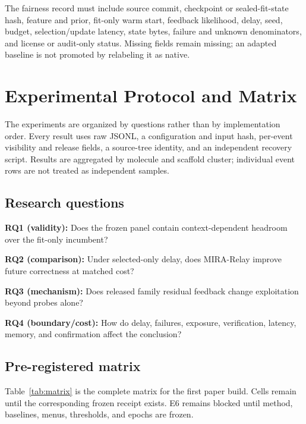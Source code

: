 \documentclass[sigconf,anonymous]{aamas}
\newcommand{\tbd}{\text{TBD}}
\begin{document}
The fairness record must include source commit, checkpoint or sealed-fit-state hash, feature and prior, fit-only warm start, feedback likelihood, delay, seed, budget, selection/update latency, state bytes, failure and unknown denominators, and license or audit-only status. Missing fields remain missing; an adapted baseline is not promoted by relabeling it as native.

\section{Experimental Protocol and Matrix}
The experiments are organized by questions rather than by implementation order. Every result uses raw JSONL, a configuration and input hash, per-event visibility and release fields, a source-tree identity, and an independent recovery script. Results are aggregated by molecule and scaffold cluster; individual event rows are not treated as independent samples.

\subsection{Research questions}
\textbf{RQ1 (validity):} Does the frozen panel contain context-dependent headroom over the fit-only incumbent?\par
\textbf{RQ2 (comparison):} Under selected-only delay, does MIRA-Relay improve future correctness at matched cost?\par
\textbf{RQ3 (mechanism):} Does released family residual feedback change exploitation beyond probes alone?\par
\textbf{RQ4 (boundary/cost):} How do delay, failures, exposure, verification, latency, memory, and confirmation affect the conclusion?

\subsection{Pre-registered matrix}
Table~\ref{tab:matrix} is the complete matrix for the first paper build. Cells remain \tbd{} until the corresponding frozen receipt exists. E6 remains blocked until method, baselines, menus, thresholds, and epochs are frozen.
\end{document}
